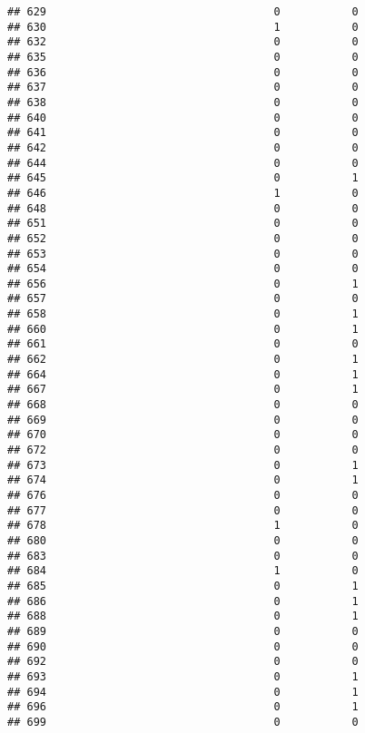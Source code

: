 \documentclass[
]{article}
\begin{document}
\begin{verbatim}
## 629                                   0           0
## 630                                   1           0
## 632                                   0           0
## 635                                   0           0
## 636                                   0           0
## 637                                   0           0
## 638                                   0           0
## 640                                   0           0
## 641                                   0           0
## 642                                   0           0
## 644                                   0           0
## 645                                   0           1
## 646                                   1           0
## 648                                   0           0
## 651                                   0           0
## 652                                   0           0
## 653                                   0           0
## 654                                   0           0
## 656                                   0           1
## 657                                   0           0
## 658                                   0           1
## 660                                   0           1
## 661                                   0           0
## 662                                   0           1
## 664                                   0           1
## 667                                   0           1
## 668                                   0           0
## 669                                   0           0
## 670                                   0           0
## 672                                   0           0
## 673                                   0           1
## 674                                   0           1
## 676                                   0           0
## 677                                   0           0
## 678                                   1           0
## 680                                   0           0
## 683                                   0           0
## 684                                   1           0
## 685                                   0           1
## 686                                   0           1
## 688                                   0           1
## 689                                   0           0
## 690                                   0           0
## 692                                   0           0
## 693                                   0           1
## 694                                   0           1
## 696                                   0           1
## 699                                   0           0

\end{verbatim}
\end{document}
